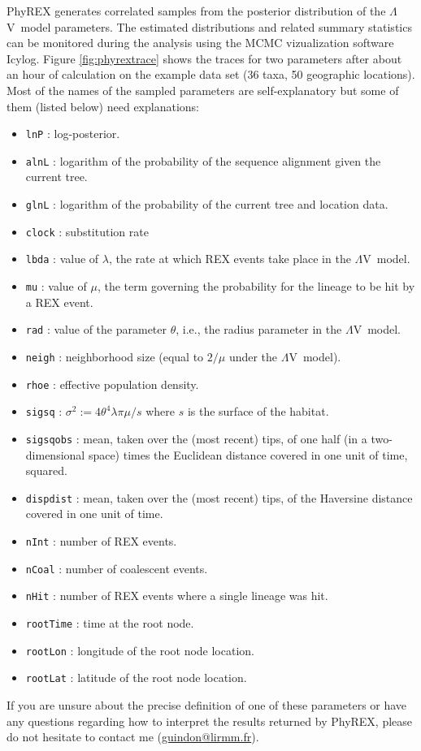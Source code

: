 \documentclass[a4paper,12pt]{article}
\newcommand{\sfv}{$\Lambda$V}
\begin{document}
PhyREX generates correlated samples from the posterior distribution of the \sfv\ model
parameters. The estimated distributions and related summary statistics can be monitored during the
analysis using the MCMC vizualization software Icylog. Figure \ref{fig:phyrextrace} shows the traces
for two parameters after about an hour of calculation on the example data set (36 taxa, 50
geographic locations). Most of the names of the sampled parameters are self-explanatory but some of
them (listed below) need explanations:
\begin{itemize}
\item \texttt{lnP} : log-posterior.
\item \texttt{alnL} : logarithm of the probability of the sequence alignment given the current tree.
\item \texttt{glnL} : logarithm of the probability of the current tree and location data. 
\item \texttt{clock} : substitution rate
\item \texttt{lbda} : value of $\lambda$, the rate at which REX events take place in the \sfv~model.
\item \texttt{mu} : value of $\mu$, the term governing the probability for the lineage to be hit by
  a REX event.
\item \texttt{rad} : value of the parameter $\theta$, i.e., the radius parameter in the \sfv~model.
\item \texttt{neigh} : neighborhood size (equal to $2/\mu$ under the \sfv~model).
\item \texttt{rhoe} : effective population density.
\item \texttt{sigsq} : $\sigma^2 := 4\theta^4\lambda \pi \mu /s$ where $s$ is the surface of the habitat.
\item \texttt{sigsqobs} : mean, taken over the (most recent) tips, of one half (in a two-dimensional space) times the Euclidean distance
  covered in one unit of time, squared.
\item \texttt{dispdist} : mean, taken over the (most recent) tips, of the Haversine distance
  covered in one unit of time.
\item \texttt{nInt} : number of REX events.
\item \texttt{nCoal} : number of coalescent events.
\item \texttt{nHit} : number of REX events where a single lineage was hit.
\item \texttt{rootTime} : time at the root node.
\item \texttt{rootLon} : longitude of the root node location.
\item \texttt{rootLat} : latitude of the root node location.
\end{itemize}
If you
are unsure about the precise definition of one of these parameters or have any questions regarding
how to interpret the results returned by PhyREX, please do not hesitate to contact me (\url{guindon@lirmm.fr}).
\end{document}
